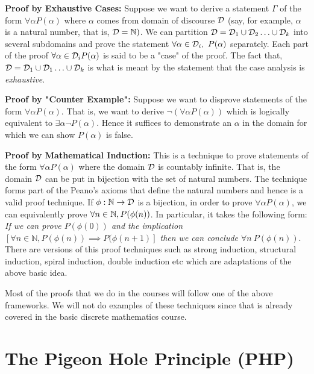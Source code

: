 \begin{description}
\item{\bf Proof by Exhaustive Cases:} Suppose we want to derive a statement $\Gamma$ of the form $\forall \alpha P(\alpha)$ where $\alpha$ comes from domain of discourse $\cal{D}$ (say, for example, $\alpha$ is a natural number, that is, $\cal{D} = \mathbb{N})$.  We can partition ${\cal D} = {\cal D} _1 \cup {\cal D}_2 \ldots \cup {\cal D}_k$ into several subdomains and prove the statement $\forall \alpha \in {\cal D}_i,~P(\alpha)$ separately. Each part of the proof  $\forall \alpha \in {\cal D}_i P(\alpha)$ is said to be a "case" of the proof. The fact that, ${\cal D} = {\cal D}_1 \cup {\cal D}_1 \ldots \cup {\cal D}_k$  is what is meant by the statement that the case analysis is {\em exhaustive}.
\item{\bf Proof by "Counter Example":} Suppose we want to disprove statements of the form $\forall \alpha P(\alpha)$. That is, we want to derive $\lnot\left(\forall \alpha P(\alpha)\right)$ which is logically equivalent to $\exists \alpha \lnot P(\alpha)$. Hence it suffices to demonstrate an $\alpha$ in the domain for which we can show $P(\alpha)$ is false.
\item{\bf Proof by Mathematical Induction:} This is a technique to prove statements of the form $\forall \alpha P(\alpha)$ where the domain ${\cal D}$ is countably infinite. That is, the domain ${\cal D}$ can be put in bijection with the set of natural numbers. The technique forms part of the Peano's axioms that define the natural numbers and hence is a valid proof technique. If $\phi : \mathbb{N} \to {\cal D}$ is a bijection, in order to prove $\forall \alpha P(\alpha)$, we can equivalently prove $\forall n \in \mathbb{N}, P(\phi(n))$. In particular, it takes the following form:
\textit{If we can prove $P(\phi(0))$ and the implication $\left[ \forall  n \in \mathbb{N}, P(\phi(n)) \implies P(\phi(n+1) \right]$  then we can conclude  $\forall n~ P(\phi(n)) $}.
There are versions of this proof techniques such as strong induction, structural induction, spiral induction, double induction etc which are adaptations of the above basic idea.
\end{description}

Most of the proofs that we do in the courses will follow one of the above frameworks. We will not do examples of these techniques since that is already covered in the basic discrete mathematics course. 

\section{The Pigeon Hole Principle (PHP)}

